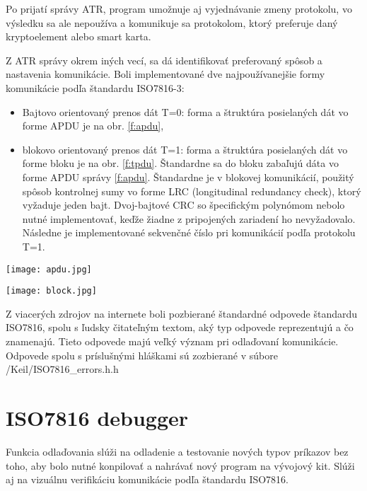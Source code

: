 \documentclass[12pt,a4wide,oneside,openright]{report}
\begin{document}
	Po prijatí správy ATR, program umožnuje aj vyjednávanie zmeny protokolu, vo výsledku sa ale nepoužíva a komunikuje sa protokolom, ktorý preferuje daný kryptoelement alebo smart karta.
	
	Z ATR správy okrem iných vecí, sa dá identifikovať preferovaný spôsob a nastavenia komunikácie. Boli implementované dve najpoužívanejšie formy komunikácie podľa štandardu ISO7816-3:
		\singlespacing
	\begin{itemize}
		\item Bajtovo orientovaný prenos dát T=0: forma a štruktúra posielaných dát vo forme APDU je na obr. \ref{f:apdu},
		\item blokovo orientovaný prenos dát T=1: forma a štruktúra posielaných dát vo forme bloku je na obr. \ref{f:tpdu}. Štandardne sa do bloku zabaľujú dáta vo forme APDU správy \ref{f:apdu}. Štandardne je v blokovej komunikácií, použitý spôsob kontrolnej sumy vo forme LRC (longitudinal redundancy check), ktorý vyžaduje jeden bajt. Dvoj-bajtové CRC so špecifickým polynómom nebolo nutné implementovať, keďže žiadne z pripojených zariadení ho nevyžadovalo. Následne je implementované sekvenčné číslo pri komunikácií podľa protokolu T=1.
	\end{itemize}
	\onehalfspacing
	
	\begin{figure*}[h]
		\centering
		\texttt{[image: apdu.jpg]}
		\caption{Štandardný format APDU správy podľa štandardu ISO7816\cite{smartcard}.}
		\label{f:apdu}
	\end{figure*}
	
	\begin{figure*}[h]
		\centering
		\texttt{[image: block.jpg]}
		\caption{\cite{SmartCardTutorial}.}
		\label{f:tpdu}
	\end{figure*}


	Z viacerých zdrojov na internete boli pozbierané štandardné odpovede štandardu ISO7816, spolu s ľudsky čitateľným textom, aký typ odpovede  reprezentujú a čo znamenajú. Tieto odpovede majú veľký význam pri odlaďovaní komunikácie. Odpovede spolu s príslušnými hláškami sú zozbierané v súbore /Keil/ISO7816\_errors.h.h


\section{ISO7816 debugger} \label{isodebug}
	Funkcia odlaďovania slúži na odladenie a testovanie nových typov príkazov bez toho, aby bolo nutné konpilovať a nahrávať nový program na vývojový kit. Slúži aj na vizuálnu verifikáciu komunikácie podľa štandardu ISO7816. 
	
\end{document}
